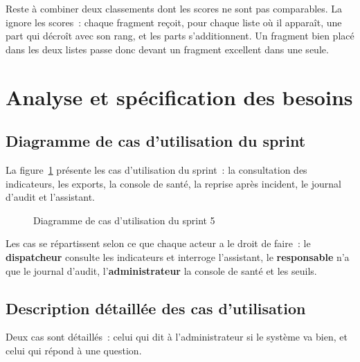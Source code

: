 Reste à combiner deux classements dont les scores ne sont pas comparables. La  ignore les scores~: chaque fragment reçoit, pour chaque liste où il apparaît,
une part qui décroît avec son rang, et les parts s'additionnent. Un fragment bien placé dans les deux
listes passe donc devant un fragment excellent dans une seule.

\section{Analyse et spécification des besoins}

\subsection{Diagramme de cas d'utilisation du sprint}

La figure~\ref{fig:uc-s5} présente les cas d'utilisation du sprint~: la consultation des indicateurs,
les exports, la console de santé, la reprise après incident, le journal d'audit et l'assistant.

\begin{figure}[H]
\centering
{}
\caption{Diagramme de cas d'utilisation du sprint 5}
\label{fig:uc-s5}
\end{figure}

Les cas se répartissent selon ce que chaque acteur a le droit de faire~: le \textbf{dispatcheur}
consulte les indicateurs et interroge l'assistant, le \textbf{responsable} n'a que le journal
d'audit, l'\textbf{administrateur} la console de santé et les seuils.

\subsection{Description détaillée des cas d'utilisation}

Deux cas sont détaillés~: celui qui dit à l'administrateur si le système va bien, et celui qui répond
à une question.

